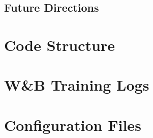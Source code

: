 \documentclass[a4paper,12pt]{article}
\begin{document}
\subsection{Future Directions}

\clearpage

\appendix
\section{Code Structure}

\section{W\&B Training Logs}

\section{Configuration Files}
\end{document}
